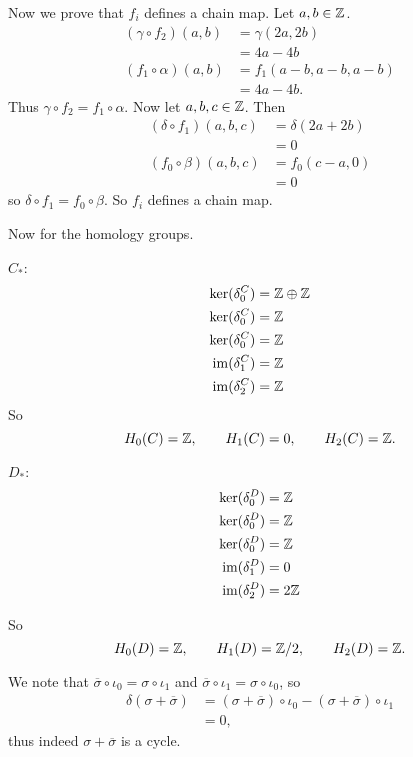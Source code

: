 \begin{questions}
\begin{solution}
    Now we prove that $f_i$ defines a chain map.
    Let $a,b \in \mathbb{Z}$.
    \begin{align*}
      (\gamma \circ f_2)(a,b)
      &= \gamma(2a, 2b) \\
      &= 4a - 4b \\
      (f_1 \circ \alpha)(a,b)
      &= f_1(a-b, a-b, a-b) \\
      &= 4a - 4b.
    \end{align*}
    Thus $\gamma \circ f_2 = f_1 \circ \alpha$.
    Now let $a,b,c \in \mathbb{Z}$.
    Then
    \begin{align*}
      (\delta \circ f_1)(a,b,c) 
      &= \delta(2a + 2b) \\
      &= 0 \\
      (f_0 \circ \beta)(a,b,c)
      &= f_0(c-a, 0) \\
      &= 0
    \end{align*}
    so $\delta \circ f_1 = f_0 \circ \beta$.
    So $f_i$ defines a chain map.

    Now for the homology groups.

    $C_*$:
    \begin{align*}
      \ker(\delta_0^C) &= \mathbb{Z} \oplus \mathbb{Z} \\
      \ker(\delta_0^C) &= \mathbb{Z} \\
      \ker(\delta_0^C) &= \mathbb{Z} \\
      \operatorname*{im}(\delta_1^C) &= \mathbb{Z} \\
      \operatorname*{im}(\delta_2^C) &= \mathbb{Z} \\
    \end{align*}
    So 
    \[
      H_0(C) = \mathbb{Z}, \qquad H_1(C) = 0, \qquad H_2(C) = \mathbb{Z}.
    \]

    $D_*$:
    \begin{align*}
      \ker(\delta_0^D) &= \mathbb{Z} \\
      \ker(\delta_0^D) &= \mathbb{Z} \\
      \ker(\delta_0^D) &= \mathbb{Z} \\
      \operatorname*{im}(\delta_1^D) &= 0 \\
      \operatorname*{im}(\delta_2^D) &= 2\mathbb{Z} \\
    \end{align*}
    
    So 
    \[
      H_0(D) = \mathbb{Z}, \qquad H_1(D) = \mathbb{Z}/2, \qquad H_2(D) = \mathbb{Z}.
    \]
  \end{solution}

  \setcounter{question}{3}
  \question \hspace{0em}
  \begin{solution}
    We note that $\overline{\sigma} \circ \iota_0 = \sigma \circ \iota_1$ and
    $\overline{\sigma} \circ \iota_1 = \sigma \circ \iota_0$, so
    \begin{align*}
      \delta(\sigma + \overline{\sigma}) 
      &= (\sigma + \overline{\sigma})\circ \iota_0 -(\sigma + \overline{\sigma})\circ \iota_1 \\
      &= 0,
    \end{align*}
    thus indeed $\sigma + \overline{\sigma}$ is a cycle.
  \end{solution}
\end{questions}

